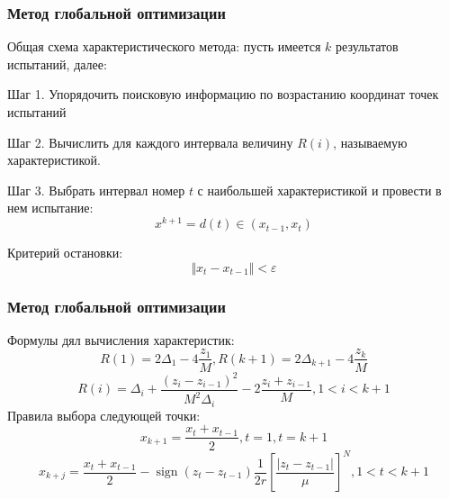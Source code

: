 \documentclass[aspectratio=1610]{beamer}
\DeclareMathOperator{\sign}{sign}
\begin{document}
\begin{frame}
  \frametitle{Метод глобальной оптимизации}
  Общая схема характеристического метода:
  пусть имеется \(k\) результатов испытаний, далее:

  Шаг 1. Упорядочить поисковую информацию по возрастанию
  координат точек испытаний

  Шаг 2. Вычислить для каждого интервала
  величину \(R(i)\), называемую характеристикой.

  Шаг 3. Выбрать интервал номер \(t\) с наибольшей
  характеристикой и провести в нем испытание:
  \begin{displaymath}
    x^{k+1}=d(t)\in (x_{t-1}, x_t)
  \end{displaymath}

  Критерий остановки:
  \begin{displaymath}
    \Vert x_t - x_{t-1}\Vert < \varepsilon
  \end{displaymath}
\end{frame}

\begin{frame}
  \frametitle{Метод глобальной оптимизации}
  Формулы дял вычисления характеристик:
  \begin{displaymath}
    R(1)=2\Delta_1-4\dfrac{z_1}{M},R(k+1)=2\Delta_{k+1}-4\dfrac{z_k}{M}
  \end{displaymath}
  \begin{displaymath}
    R(i)=\Delta_i+\dfrac{(z_i-z_{i-1})^2}{M^2\Delta_i}-2\dfrac{z_i+z_{i-1}}{M},1<i<k+1
  \end{displaymath}
  Правила выбора следующей точки:
  \begin{displaymath}
    x_{k+1}=\dfrac{x_{t}+x_{t-1}}{2},t=1,t=k+1
  \end{displaymath}
  \begin{displaymath}
    x_{k+j}=\dfrac{x_{t}+x_{t-1}}{2}-\sign(z_{t}-z_{t-1})\dfrac{1}{2r}\left[\dfrac{|z_{t}-z_{t-1}|}{\mu}\right]^N,1<t<k+1
  \end{displaymath}
\end{frame}
\end{document}
